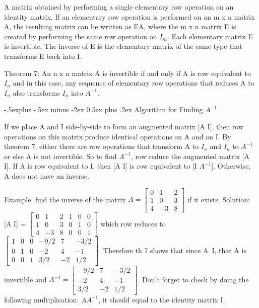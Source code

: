 \documentclass[10pt,landscape]{article}
\makeatletter
\renewcommand{\subsection}{\@startsection{subsection}{2}{0mm}%
                                {-.5explus -.5ex minus -2ex}%
                                {0.5ex plus .2ex}%
                                {\normalfont\footnotesize\bfseries}}
\makeatother
\begin{document}
\begin{multicols}{4}
{{A matrix obtained by performing a single elementary row operation on an identity matrix. If an elementary row operation is performed on an m x n matrix A, the resulting matrix can be written as EA, where the m x n matrix E is created by performing the same row operation on $I_m$.  Each elementary matrix E is invertible. The inverse of E is the elementary matrix of the same type that transforms E back into I. 

Theorem 7: An n x n matrix A is invertible if and only if A is row equivalent to $I_n$ and in this case, any sequence of elementary row operations that reduces A to $I_n$ also transforms $I_n$ into $A^{-1}$. 

\subsection{Algorithm for Finding $A^{-1}$}

If we place A and I side-by-side to form an augmented matrix [A I], then row operations on this matrix produce identical operations on A and on I. By theorem 7, either there are row operations that transform A to $I_n$ and $I_n$ to $A^{-1}$ or else A is not invertible. So to find $A^{-1}$, row reduce the augmented matrix [A I]. If A is row equivalent to I, then [A I] is row equivalent to [I $A^{-1}$]. Otherwise, A does not have an inverse.

\medskip 

Example: find the inverse of the matrix $A = \left[\begin{array}{rrrr}0 & 1 & 2\\1 & 0 & 3\\4 & -3 & 8\end{array}\right]$ if it exists.  Solution: [A I] = $\left[\begin{array}{rcrrrrr}0 & 1 & 2 & 1 & 0 & 0\\1 & 0 & 3 & 0 & 1 & 0\\4 & -3 & 8 & 0 & 0 & 1\end{array}\right]$ which row reduces to $\left[\begin{array}{rcrrrrr}1 & 0 & 0 & -9/2 & 7 & -3/2\\0 & 1 & 0 & -2 & 4 & -1\\0 & 0 & 1 & 3/2 & -2 & 1/2\end{array}\right]$. Therefore th 7 shows that since A~I, that A is invertible and $A^{-1}=\left[\begin{array}{rrrr}-9/2 & 7 & -3/2\\-2 & 4 & -1\\3/2 & -2 & 1/2\end{array}\right]$. Don't forget to check by doing the following multiplication: $AA^{-1}$, it should equal to the identity matrix I.


}}
\end{multicols}
\end{document}
